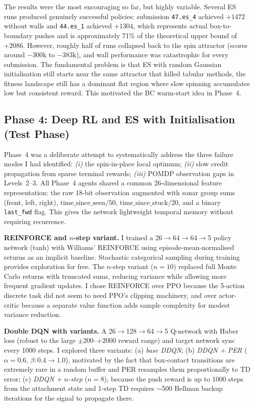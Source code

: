 \documentclass[11pt, oneside]{article}
\begin{document}
The results were the most encouraging so far, but highly variable. Several ES runs produced genuinely successful policies: submission \texttt{47.es\_4} achieved $+1472$ without walls and \texttt{44.es\_1} achieved $+1304$, which represents actual box-to-boundary pushes and is approximately 71\% of the theoretical upper bound of $+2086$. However, roughly half of runs collapsed back to the spin attractor (scores around $-300\text{k}$ to $-383\text{k}$), and wall performance was catastrophic for every submission. The fundamental problem is that ES with random Gaussian initialisation still starts near the same attractor that killed tabular methods, the fitness landscape still has a dominant flat region where slow spinning accumulates low but consistent reward. This motivated the BC warm-start idea in Phase~4.

\subsection{Phase 4: Deep RL and ES with Initialisation (Test Phase)}

Phase~4 was a deliberate attempt to systematically address the three failure modes I had identified: \emph{(i)} the spin-in-place local optimum; \emph{(ii)} slow credit propagation from sparse terminal rewards; \emph{(iii)} POMDP observation gaps in Levels~2--3. All Phase~4 agents shared a common 26-dimensional feature representation: the raw 18-bit observation augmented with sonar group sums (front, left, right), $\text{time\_since\_seen}/50$, $\text{time\_since\_stuck}/20$, and a binary \texttt{last\_fwd} flag. This gives the network lightweight temporal memory without requiring recurrence.

\textbf{REINFORCE \cite{williams1992} and $n$-step variant.} I trained a 26$\to$64$\to$64$\to$5 policy network (tanh) with Williams' REINFORCE using episode-mean-normalised returns as an implicit baseline. Stochastic categorical sampling during training provides exploration for free. The $n$-step variant ($n=10$) replaced full Monte Carlo returns with truncated sums, reducing variance while allowing more frequent gradient updates. I chose REINFORCE over PPO because the 5-action discrete task did not seem to need PPO's clipping machinery, and over actor-critic because a separate value function adds sample complexity for modest variance reduction.

\textbf{Double DQN \cite{van2016deep} with variants.} A 26$\to$128$\to$64$\to$5 Q-network with Huber loss (robust to the large $\pm 200$--$+2000$ reward range) and target network sync every 1000 steps. I explored three variants: (a) \textit{base DDQN}; (b) \textit{DDQN + PER} \cite{schaul2015} ($\alpha=0.6$, $\beta: 0.4{\to}1.0$), motivated by the fact that box-contact transitions are extremely rare in a random buffer and PER resamples them proportionally to TD error; (c) \textit{DDQN + $n$-step} ($n=8$), because the push reward is up to 1000 steps from the attachment state and 1-step TD requires $\sim$500 Bellman backup iterations for the signal to propagate there.
\end{document}
